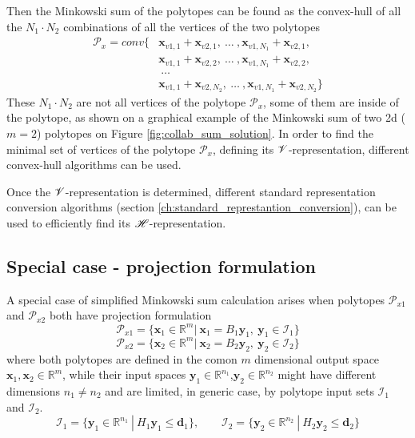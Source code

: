 Then the Minkowski sum of the polytopes can be found as the convex-hull of all the $N_1\!\cdot\!N_2$ combinations of all the vertices of the two polytopes
\begin{equation}
\begin{split}
    \mathcal{P}_x =  conv\big\{&\bm{x}_{v1,1} + \bm{x}_{v2,1},~ \ldots~,\bm{x}_{v1, N_1} + \bm{x}_{v2,1},\\&\bm{x}_{v1,1} + \bm{x}_{v2,2},~\ldots~,\bm{x}_{v1, N_1} + \bm{x}_{v2,2},\\&~\ldots~\\
    &\bm{x}_{v1, 1}  +\bm{x}_{v2,N_2}, ~\ldots~ ,\bm{x}_{v1, N_1} +\bm{x}_{v2,N_2}\big\}
\end{split}
\end{equation}
These $N_1\!\cdot\!N_2$ are not all vertices of the polytope $\mathcal{P}_x$, some of them are inside of the polytope, as shown on a graphical example of the Minkowski sum of two  2d ($m=2$) polytopes on Figure \ref{fig:collab_sum_solution}. In order to find the minimal set of vertices of the polytope $\mathcal
{P}_x$, defining its $\mathscr{V}$-representation, different convex-hull algorithms \cite{Barber1996} can be used.

Once the $\mathscr{V}$-representation is determined, different standard representation conversion algorithms (section \ref{ch:standard_represtantion_conversion}), can be used to efficiently find its $\mathscr{H}$-representation.


\subsection{Special case - projection formulation}
A special case of simplified Minkowski sum calculation arises when polytopes $\mathcal{P}_{x1}$ and $\mathcal{P}_{x2}$ both have projection formulation
\begin{equation}
    \mathcal{P}_{x1}=\{\bm{x}_1\in\mathbb{R}^m |~ \bm{x}_1 = B_1\bm{y}_1,~\bm{y}_1 \in \mathcal{I}_1  \}
\end{equation}
\begin{equation}
    \mathcal{P}_{x2}=\{\bm{x}_2\in\mathbb{R}^m |~ \bm{x}_2 = B_2\bm{y}_2,~\bm{y}_2 \in \mathcal{I}_2  \}
\end{equation}
where both polytopes are defined in the comon $m$ dimensional output space $\bm{x}_1,\bm{x}_2\in\mathbb{R}^m$, while their input spaces $\bm{y}_1\in\mathbb{R}^{n_1}$,$\bm{y}_2\in\mathbb{R}^{n_2}$ might have different dimensions $n_1\neq n_2$ and are limited, in generic case, by polytope input sets $\mathcal{I}_1$ and $\mathcal{I}_2$.
\begin{equation}
    \mathcal{I}_{1}=\{\bm{y}_1\in\mathbb{R}^{n_1} ~|~ H_1\bm{y}_1 \leq \bm{d}_1\}, \qquad
    \mathcal{I}_{2}=\{\bm{y}_2\in\mathbb{R}^{n_2} ~|~ H_2\bm{y}_2 \leq \bm{d}_2\}
\end{equation}

